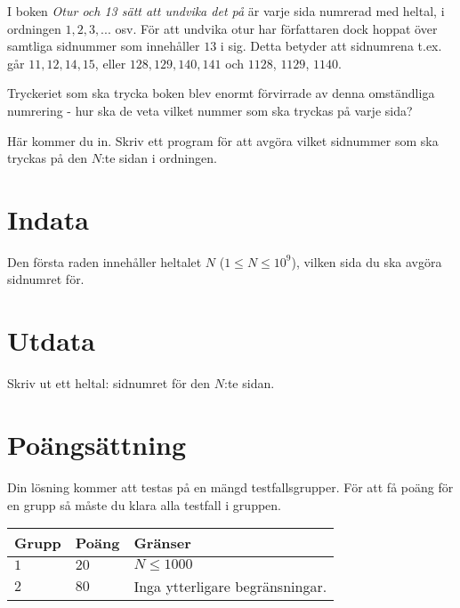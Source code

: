 I boken \emph{Otur och 13 sätt att undvika det på} är varje sida numrerad med heltal, i ordningen $1, 2, 3, ...$ osv. För att undvika otur har författaren dock
hoppat över samtliga sidnummer som innehåller $13$ i sig. Detta betyder att sidnumrena t.ex. går $11, 12, 14, 15$, eller $128, 129, 140, 141$ och $1128$, $1129$, $1140$.

Tryckeriet som ska trycka boken blev enormt förvirrade av denna omständliga numrering - hur ska de veta vilket nummer som ska tryckas på varje sida?

Här kommer du in. Skriv ett program för att avgöra vilket sidnummer som ska tryckas på den $N$:te sidan i ordningen.

\section*{Indata}
Den första raden innehåller heltalet $N$ ($1 \leq N \leq 10^9$), vilken sida du ska avgöra sidnumret för.

\section*{Utdata}
Skriv ut ett heltal: sidnumret för den $N$:te sidan.

\section*{Poängsättning}
Din lösning kommer att testas på en mängd testfallsgrupper. För att få poäng
för en grupp så måste du klara alla testfall i gruppen.

\noindent
\begin{tabular}{| l | l | p{12cm} |}
  \hline
  \textbf{Grupp} & \textbf{Poäng} & \textbf{Gränser} \\ \hline
  $1$    & $20$      & $N \leq 1000$ \\ \hline
  $2$    & $80$      & Inga ytterligare begränsningar. \\ \hline
\end{tabular}


